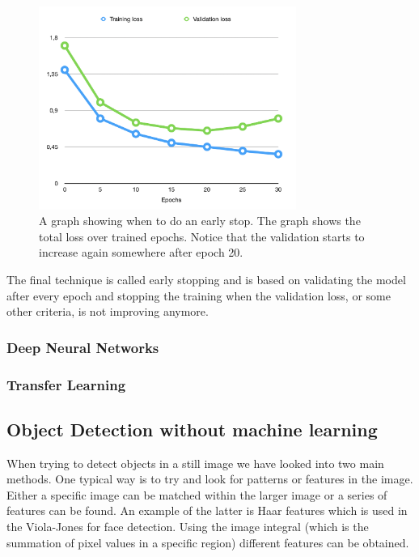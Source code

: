 \begin{figure}[hbtp]
\begin{center}
\includegraphics[width = 0.75\textwidth]{./Images/early_stop.jpg} 
\caption{A graph showing when to do an early stop. The graph shows the total loss over trained epochs. Notice that the validation starts to increase again somewhere after epoch 20.}
\end{center}
\end{figure}

The final technique is called early stopping and is based on validating the model after every epoch and stopping the training when the validation loss, or some other criteria, is not improving anymore.

\subsubsection{Deep Neural Networks}

\subsubsection{Transfer Learning}


\subsection{Object Detection without machine learning}

When trying to detect objects in a still image we have looked into two main methods. One typical way is to try and look for patterns or features in the image.
Either a specific image can be matched within the larger image or a series of features can be found.
An example of the latter is Haar features which is used in the Viola-Jones for face detection. Using the image integral (which is the summation of pixel values in a specific region) different features can be obtained.

